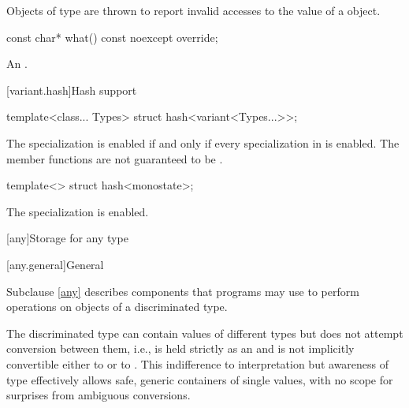 \pnum
Objects of type  are thrown to report invalid
accesses to the value of a  object.

%
\begin{itemdecl}
const char* what() const noexcept override;
\end{itemdecl}

\begin{itemdescr}
\pnum
\returns
An  \ntbs{}.
\end{itemdescr}

[variant.hash]{Hash support}

%
\begin{itemdecl}
template<class... Types> struct hash<variant<Types...>>;
\end{itemdecl}

\begin{itemdescr}
\pnum
The specialization  is enabled
if and only if every specialization in  is enabled.
The member functions are not guaranteed to be .
\end{itemdescr}

%
\begin{itemdecl}
template<> struct hash<monostate>;
\end{itemdecl}

\begin{itemdescr}
\pnum
The specialization is enabled.
\end{itemdescr}


[any]{Storage for any type}

[any.general]{General}

\pnum
Subclause \ref{any} describes components that \Cpp{} programs may use to perform operations on objects of a discriminated type.

\pnum
\begin{note}
The discriminated type can contain values of different types but does not attempt conversion between them,
i.e.,  is held strictly as an  and is not implicitly convertible either to  or to .
This indifference to interpretation but awareness of type effectively allows safe, generic containers of single values, with no scope for surprises from ambiguous conversions.
\end{note}

